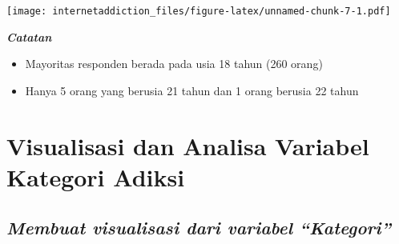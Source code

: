 \documentclass[
]{article}
\newenvironment{Shaded}{\begin{snugshade}}{\end{snugshade}}
\newcommand{\DataTypeTok}[1]{\textcolor[rgb]{0.13,0.29,0.53}{#1}}
\newcommand{\DecValTok}[1]{\textcolor[rgb]{0.00,0.00,0.81}{#1}}
\newcommand{\KeywordTok}[1]{\textcolor[rgb]{0.13,0.29,0.53}{\textbf{#1}}}
\newcommand{\NormalTok}[1]{#1}
\newcommand{\OperatorTok}[1]{\textcolor[rgb]{0.81,0.36,0.00}{\textbf{#1}}}
\newcommand{\StringTok}[1]{\textcolor[rgb]{0.31,0.60,0.02}{#1}}
\providecommand{\tightlist}{%
  \setlength{\itemsep}{0pt}\setlength{\parskip}{0pt}}
\begin{document}
\texttt{[image: internetaddiction\_files/figure-latex/unnamed-chunk-7-1.pdf]}

\textbf{\emph{Catatan}}

\begin{itemize}
\tightlist
\item
  Mayoritas responden berada pada usia 18 tahun (260 orang)
\item
  Hanya 5 orang yang berusia 21 tahun dan 1 orang berusia 22 tahun
\end{itemize}

\hypertarget{visualisasi-dan-analisa-variabel-kategori-adiksi}{%
\section{\texorpdfstring{\textbf{Visualisasi dan Analisa Variabel
Kategori
Adiksi}}{Visualisasi dan Analisa Variabel Kategori Adiksi}}\label{visualisasi-dan-analisa-variabel-kategori-adiksi}}

\hypertarget{membuat-visualisasi-dari-variabel-kategori}{%
\subsection{\texorpdfstring{\emph{Membuat visualisasi dari variabel
``Kategori''}}{Membuat visualisasi dari variabel ``Kategori''}}\label{membuat-visualisasi-dari-variabel-kategori}}

\begin{Shaded}
\end{Shaded}
\end{document}
